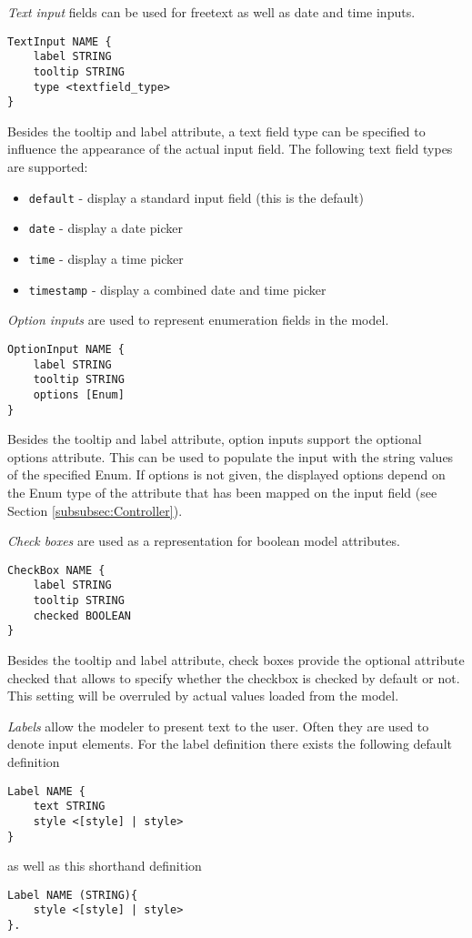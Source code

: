 \textit{Text input} fields can be used for freetext as well as date and time inputs.
\begin{lstlisting}
TextInput NAME {
	label STRING
	tooltip STRING
	type <textfield_type>
}
\end{lstlisting}
Besides the tooltip and label attribute, a text field type can be specified to influence the appearance of the actual input field. The following text field types are supported:
\begin{itemize}
\item \lstinline!default! - display a standard input field (this is the default)
\item \lstinline!date! - display a date picker
\item \lstinline!time! - display a time picker
\item \lstinline!timestamp! - display a combined date and time picker
\end{itemize}

\textit{Option inputs} are used to represent enumeration fields in the model.
\begin{lstlisting}
OptionInput NAME {
	label STRING
	tooltip STRING
	options [Enum]
}
\end{lstlisting}

Besides the tooltip and label attribute, option inputs support the optional options attribute. This can be used to populate the input with the string values of the specified Enum. If options is not given, the displayed options depend on the Enum type of the attribute that has been mapped on the input field (see Section \ref{subsubsec:Controller}).

\textit{Check boxes} are used as a representation for boolean model attributes.
\begin{lstlisting}
CheckBox NAME {
	label STRING
	tooltip STRING
	checked BOOLEAN
}
\end{lstlisting}

Besides the tooltip and label attribute, check boxes provide the optional attribute checked that allows to specify whether the checkbox is checked by default or not. This setting will be overruled by actual values loaded from the model.

\textit{Labels} allow the modeler to present text to the user. Often they are used to denote input elements. For the label definition there exists the following default definition
\begin{lstlisting}
Label NAME {
	text STRING
	style <[style] | style>
}
\end{lstlisting}
as well as this shorthand definition
\begin{lstlisting}
Label NAME (STRING){
	style <[style] | style>
}.
\end{lstlisting}

